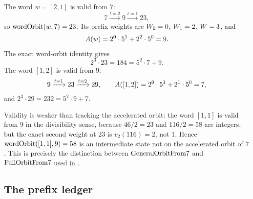 \begin{example}\label{ex:wordA}
The word $w=[2,1]$ is valid from $7$:
\begin{equation*}
  7 \xrightarrow{t=2} 9 \xrightarrow{t=1} 23,
\end{equation*}
so $\mathrm{wordOrbit}(w,7)=23$.  Its prefix weights are
$W_0=0$, $W_1=2$, $W=3$, and
\begin{equation*}
  A(w)=2^0\cdot5^1+2^2\cdot5^0=9.
\end{equation*}
The exact word-orbit identity gives
\begin{equation*}
  2^3\cdot23=184=5^2\cdot7+9.
\end{equation*}
The word $[1,2]$ is valid from $9$:
\begin{equation*}
  9 \xrightarrow{t=1} 23 \xrightarrow{t=2} 29,
\qquad
  A([1,2])=2^0\cdot5^1+2^1\cdot5^0=7,
\end{equation*}
and $2^3\cdot29=232=5^2\cdot9+7$.

Validity is weaker than tracking the accelerated orbit: the word
$[1,1]$ is valid from $9$ in the divisibility sense, because
$46/2=23$ and $116/2=58$ are integers, but the exact second weight at
$23$ is $v_2(116)=2$, not $1$.  Hence
$\mathrm{wordOrbit}([1,1],9)=58$ is an intermediate state not on the
accelerated orbit of $7$.  This is precisely the distinction between
$\mathrm{GeneralOrbitFrom7}$ and $\mathrm{FullOrbitFrom7}$ used in .
\end{example}

\subsection{The prefix ledger}

